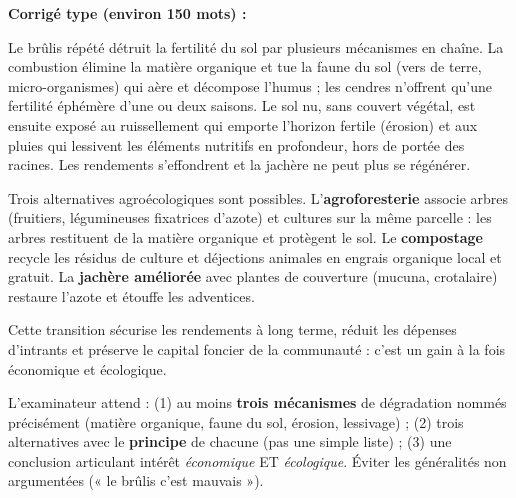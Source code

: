 \documentclass[11pt]{article}
\newcommand{\cle}[1]{{\popxbold\color{popdark}#1}}
\begin{document}
\begin{corrige}
\textbf{Corrigé type (environ 150 mots) :}

Le brûlis répété détruit la fertilité du sol par plusieurs mécanismes en chaîne. La combustion élimine la \cle{matière organique} et tue la faune du sol (vers de terre, micro-organismes) qui aère et décompose l'humus ; les cendres n'offrent qu'une fertilité éphémère d'une ou deux saisons. Le sol nu, sans couvert végétal, est ensuite exposé au \cle{ruissellement} qui emporte l'horizon fertile (érosion) et aux pluies qui \cle{lessivent} les éléments nutritifs en profondeur, hors de portée des racines. Les rendements s'effondrent et la jachère ne peut plus se régénérer.

Trois alternatives agroécologiques sont possibles. L'\textbf{agroforesterie} associe arbres (fruitiers, légumineuses fixatrices d'azote) et cultures sur la même parcelle : les arbres restituent de la matière organique et protègent le sol. Le \textbf{compostage} recycle les résidus de culture et déjections animales en engrais organique local et gratuit. La \textbf{jachère améliorée} avec plantes de couverture (mucuna, crotalaire) restaure l'azote et étouffe les adventices.

Cette transition sécurise les rendements à long terme, réduit les dépenses d'intrants et préserve le capital foncier de la communauté : c'est un gain à la fois économique et écologique.
\end{corrige}

\begin{attention}
L'examinateur attend : (1) au moins \textbf{trois mécanismes} de dégradation nommés précisément (matière organique, faune du sol, érosion, lessivage) ; (2) trois alternatives avec le \textbf{principe} de chacune (pas une simple liste) ; (3) une conclusion articulant intérêt \emph{économique} ET \emph{écologique}. Éviter les généralités non argumentées (« le brûlis c'est mauvais »).
\end{attention}
\end{document}
